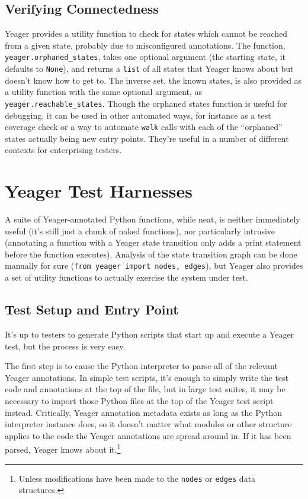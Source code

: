\subsection{Verifying Connectedness}
Yeager provides a utility function to check for states which cannot be reached from a given state, probably due to misconfigured annotations. The function, \texttt{yeager.orphaned\_states}, takes one optional argument (the starting state, it defaults to \texttt{None}), and returns a \texttt{list} of all states that Yeager knows about but doesn't know how to get to. The inverse set, the known states, is also provided as a utility function with the same optional argument, as \texttt{yeager.reachable\_states}. Though the orphaned states function is useful for debugging, it can be used in other automated ways, for instance as a test coverage check or a way to automate \texttt{walk} calls with each of the ``orphaned'' states actually being new entry points. They're useful in a number of different contexts for enterprising testers.

\section{Yeager Test Harnesses}
A suite of Yeager-annotated Python functions, while neat, is neither immediately useful (it's still just a chunk of naked functions), nor particularly intrusive (annotating a function with a Yeager state transition only adds a print statement before the function executes). Analysis of the state transition graph can be done manually for sure (\texttt{from yeager import nodes, edges}), but Yeager also provides a set of utility functions to actually exercise the system under test.

\subsection{Test Setup and Entry Point}
It's up to testers to generate Python scripts that start up and execute a Yeager test, but the process is very easy.

The first step is to cause the Python interpreter to parse all of the relevant Yeager annotations. In simple test scripts, it's enough to simply write the test code and annotations at the top of the file, but in large test suites, it may be necessary to import those Python files at the top of the Yeager test script instead. Critically, Yeager annotation metadata exists as long as the Python interpreter instance does, so it doesn't matter what modules or other structure applies to the code the Yeager annotations are spread around in. If it has been parsed, Yeager knows about it.\footnote{Unless modifications have been made to the \texttt{nodes} or \texttt{edges} data structures.}


